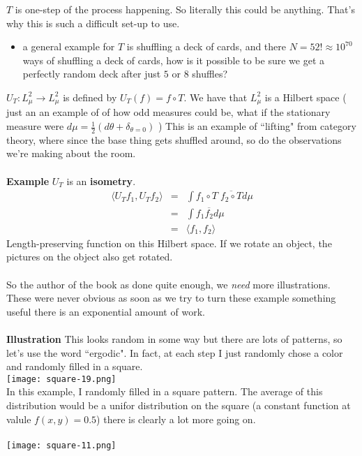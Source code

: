 \documentclass[12pt]{article}
\begin{document}
$T$ is one-step of the process happening.  So literally this could be anything.  That's why this is such a difficult set-up to use.
\begin{itemize}
	\item a general example for $T$ is shuffling a deck of cards, and there $N = 52! \approx 10^{70}$ ways of shuffling a deck of cards, how is it possible to be sure we get a perfectly random deck after just $5$ or $8$ shuffles?
\end{itemize} 
$U_T: L_\mu^2 \to L_\mu^2$ is defined by $U_T(f)= f \circ T$.  We have that $L_\mu^2$ is a Hilbert space ( just an an example of of how odd measures could be, what if the stationary measure were $d\mu = \frac{1}{2}(d\theta + \delta_{\theta=0})$ )  This is an example of ``lifting" from category theory, where since the base thing gets shuffled around, so do the observations we're making about the room.  \\ \\
\textbf{Example} $U_T$ is an \textbf{isometry}.  
\begin{eqnarray*}
\langle U_T f_1 , U_T f_2 \rangle  &=& \int f_1 \circ T \; \overline{f_2 \circ T} d\mu  \\
&=& \int f_1 \overline{f_2} d\mu \\
&=& \langle f_1, f_2 \rangle 
\end{eqnarray*} Length-preserving function on this Hilbert space.  If we rotate an object, the pictures on the object also get rotated. \\ \\
So the author of the book as done quite enough, we \textit{need} more illustrations.  These were never obvious as soon as we try to turn these example something useful there is an exponential amount of work. \\ \\
\textbf{Illustration} This looks random in some way but there are lots of patterns, so let's use the word ``ergodic".  In fact, at each step I just randomly chose a color and randomly filled in a square. \\
\texttt{[image: square-19.png]} \\
In this example, I randomly filled in a  square pattern.  The average of this distribution would be a unifor distribution on the square (a constant function at valule $f(x,y) = 0.5$) there is clearly a lot more going on.   \\ \\
\texttt{[image: square-11.png]} \\
\end{document}
